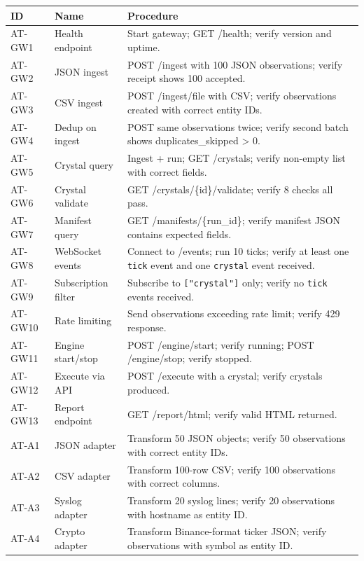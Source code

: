 \documentclass[11pt,a4paper,twoside]{article}
\theoremstyle{definition}
\theoremstyle{plain}
\theoremstyle{remark}
\begin{document}
\begin{longtable}{l l p{6.5cm}}
\toprule
\textbf{ID} & \textbf{Name} & \textbf{Procedure} \\
\midrule
\endfirsthead
\midrule
\endhead
\bottomrule
\endfoot
AT-GW1 & Health endpoint & Start gateway; GET /health; verify version
  and uptime. \\
AT-GW2 & JSON ingest & POST /ingest with 100 JSON observations; verify
  receipt shows 100 accepted. \\
AT-GW3 & CSV ingest & POST /ingest/file with CSV; verify observations
  created with correct entity IDs. \\
AT-GW4 & Dedup on ingest & POST same observations twice; verify second
  batch shows duplicates\_skipped > 0. \\
AT-GW5 & Crystal query & Ingest + run; GET /crystals; verify non-empty
  list with correct fields. \\
AT-GW6 & Crystal validate & GET /crystals/\{id\}/validate; verify 8
  checks all pass. \\
AT-GW7 & Manifest query & GET /manifests/\{run\_id\}; verify manifest
  JSON contains expected fields. \\
AT-GW8 & WebSocket events & Connect to /events; run 10 ticks; verify
  at least one \texttt{tick} event and one \texttt{crystal} event
  received. \\
AT-GW9 & Subscription filter & Subscribe to \texttt{["crystal"]} only;
  verify no \texttt{tick} events received. \\
AT-GW10 & Rate limiting & Send observations exceeding rate limit;
  verify 429 response. \\
AT-GW11 & Engine start/stop & POST /engine/start; verify running; POST
  /engine/stop; verify stopped. \\
AT-GW12 & Execute via API & POST /execute with a crystal; verify
  crystals produced. \\
AT-GW13 & Report endpoint & GET /report/html; verify valid HTML
  returned. \\
AT-A1 & JSON adapter & Transform 50 JSON objects; verify 50
  observations with correct entity IDs. \\
AT-A2 & CSV adapter & Transform 100-row CSV; verify 100 observations
  with correct columns. \\
AT-A3 & Syslog adapter & Transform 20 syslog lines; verify 20
  observations with hostname as entity ID. \\
AT-A4 & Crypto adapter & Transform Binance-format ticker JSON; verify
  observations with symbol as entity ID. \\

\end{longtable}
\end{document}
